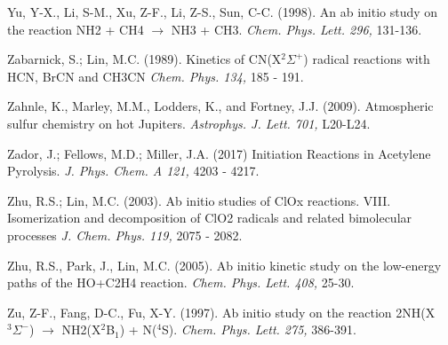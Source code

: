 \documentclass[12pt,landscape]{article}
\newcounter{reaction}
\begin{document}
Yu, Y-X., Li, S-M., Xu, Z-F., Li, Z-S., Sun, C-C. (1998). An ab initio study on the reaction NH2 + CH4 $\rightarrow$ NH3 + CH3. {\em Chem. Phys. Lett. 296,} 131-136.

Zabarnick, S.; Lin, M.C. (1989).
Kinetics of CN(X$^2\Sigma^+$) radical reactions with HCN, BrCN and CH3CN
{\em Chem. Phys. 134,} 185 - 191.

Zahnle, K., Marley, M.M., Lodders, K., and Fortney, J.J. (2009). Atmospheric sulfur chemistry on hot Jupiters. {\em Astrophys. J. Lett. 701,} L20-L24.

Zador, J.; Fellows, M.D.; Miller, J.A. (2017)
Initiation Reactions in Acetylene Pyrolysis.
{\em  J. Phys. Chem. A 121,} 4203 - 4217.

Zhu, R.S.; Lin, M.C. (2003).
 Ab initio studies of ClOx reactions. VIII. Isomerization and decomposition of ClO2 radicals and related bimolecular processes
{\em J. Chem. Phys. 119,}  2075 - 2082.

Zhu, R.S., Park, J., Lin, M.C. (2005). Ab initio kinetic study on the low-energy paths of the HO+C2H4 reaction.  {\em Chem. Phys. Lett. 408,} 25-30.

Zu, Z-F., Fang, D-C., Fu, X-Y. (1997). Ab initio study on the reaction 2NH(X$^3\Sigma^-$)  $\rightarrow$ NH2(X$^2$B$_1$) + N($^4$S).  {\em Chem. Phys. Lett. 275,} 386-391.
\end{document}
